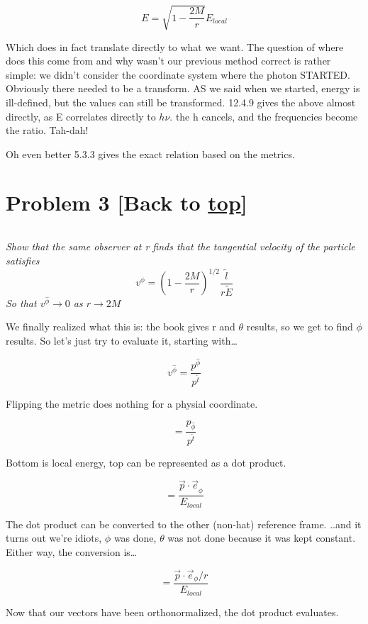 \documentclass[landscape,letterpaper,10pt,english]{article}
\begin{document}
\[ E = \sqrt{1-\frac{2M}{r}} E_{local}\]

    Which does in fact translate directly to what we want. The question of
where does this come from and why wasn't our previous method correct is
rather simple: we didn't consider the coordinate system where the photon
STARTED. Obviously there needed to be a transform. AS we said when we
started, energy is ill-defined, but the values can still be transformed.
12.4.9 gives the above almost directly, as E correlates directly to
\(h\nu\). the h cancels, and the frequencies become the ratio. Tah-dah!

Oh even better 5.3.3 gives the exact relation based on the metrics.

    \hypertarget{problem-3-back-to-top}{%
\section{\texorpdfstring{Problem 3 {[}Back to
\hyperref[toc]{top}{]}}{Problem 3 {[}Back to {]}}}\label{problem-3-back-to-top}}

\[\label{P3}\]

\emph{Show that the same observer at r finds that the tangential
velocity of the particle satisfies}
\[ v^\hat{\phi} = \left( 1 - \frac{2M}{r} \right)^{1/2} \frac{\tilde l}{r\tilde E} \]
\emph{So that \(v^\hat{\phi} \rightarrow 0\) as \(r \rightarrow 2M\)}

    We finally realized what this is: the book gives r and \(\theta\)
results, so we get to find \(\phi\) results. So let's just try to
evaluate it, starting with\ldots{}

\[ v^{\hat\phi} = \frac{p^{\hat\phi}}{p^{\hat t}} \]

Flipping the metric does nothing for a physial coordinate.

\[ = \frac{p_{\hat\phi}}{p^{\hat t}} \]

Bottom is local energy, top can be represented as a dot product.

\[ = \frac{\vec p \cdot \vec e_{\hat\phi}}{E_{local}} \]

The dot product can be converted to the other (non-hat) reference frame.
..and it turns out we're idiots, \(\phi\) was done, \(\theta\) was not
done because it was kept constant. Either way, the conversion is\ldots{}

\[ = \frac{\vec p \cdot \vec e_{\phi}/r}{E_{local}} \]

Now that our vectors have been orthonormalized, the dot product
evaluates.
\end{document}
